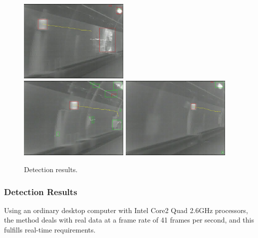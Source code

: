 \begin{figure}
{}
{
\includegraphics[width=0.47\textwidth,bb=0 0 640 480]{02veriTrjimg00046.jpg}
}\\
{
\includegraphics[width=0.47\textwidth,bb=0 0 640 480]{00veriTrjimg00032.jpg}
}
{
\includegraphics[width=0.47\textwidth,bb=0 0 640 480]{06veriTrjimg00032.jpg}
}

\caption[Detection results]{Detection results.}
\label{fig:sixs}
\end{figure}

\subsubsection{Detection Results}

Using an ordinary desktop computer with Intel Core2 Quad 2.6GHz processors, the method deals with real data at a frame rate of 41 frames per second, and this fulfills real-time requirements.


